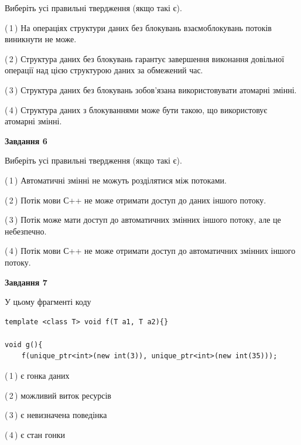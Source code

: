 \documentclass[12pt, ukrainian]{article}
\begin{document}
\begin {large}
{Виберіть усі правильні твердження (якщо такі є).\par
\vspace{2mm}

(\,1\,) На операціях структури даних без блокувань взаємоблокувань потоків виникнути не може.%

(\,2\,) Структура даних без блокувань гарантує завершення виконання довільної операції над цією структурою даних за обмежений час.%

(\,3\,) Структура даних без блокувань зобов’язана використовувати атомарні змінні.%

(\,4\,) Структура даних з блокуваннями може бути такою, що використовує атомарні змінні.%
\newpage


\begin{center}
\textbf{Завдання 6}
\end{center}

Виберіть усі правильні твердження (якщо такі є).\par
\vspace{2mm}

(\,1\,) Автоматичні змінні не можуть розділятися між потоками.%

(\,2\,) Потік мови С++ не може отримати доступ до даних іншого потоку.%

(\,3\,) Потік може мати доступ до автоматичних змінних іншого потоку, але це небезпечно.%

(\,4\,) Потік мови С++ не може отримати доступ до автоматичних змінних іншого потоку.%


\begin{center}
\textbf{Завдання 7}
\end{center}

У цьому фрагменті коду
\begin{verbatim}
template <class T> void f(T a1, T a2){}

void g(){
    f(unique_ptr<int>(new int(3)), unique_ptr<int>(new int(35)));
\end{verbatim}

(\,1\,) є гонка даних%

(\,2\,) можливий виток ресурсів%

(\,3\,) є невизначена поведінка%

(\,4\,) є стан гонки%

}
\end {large}

\vspace{4mm}
\newpage
\end{document}
